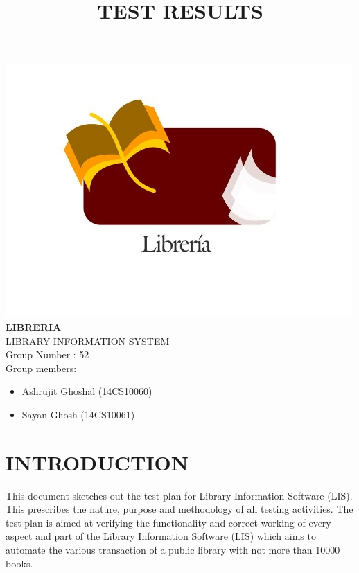 \documentclass{article}
\title{\textbf{TEST RESULTS}}
\author{}
\date{}
\begin{document}
\maketitle
\begin{center}
	\includegraphics[scale=0.6]{images/logoLIS_modified.jpg}
	\\
	\textbf{LIBRERIA}\\
	LIBRARY INFORMATION SYSTEM\\
	Group Number : 52\\
	Group members: \\
	\begin{itemize}
		\item \begin{center}Ashrujit Ghoshal (14CS10060)\end{center}
		\item \begin{center}Sayan Ghosh (14CS10061)\end{center}
	\end{itemize}
	
\end{center}

\newpage
\hypertarget{toc}{}
\tableofcontents
\newpage
\section{INTRODUCTION}
This document sketches out the test plan for Library Information Software (LIS). This prescribes the nature, purpose and methodology of all testing activities. The test plan is aimed at verifying the functionality and correct working of every aspect and part of the Library Information Software (LIS) which aims to automate the various transaction of a public library with not more than 10000 books.
\end{document}

